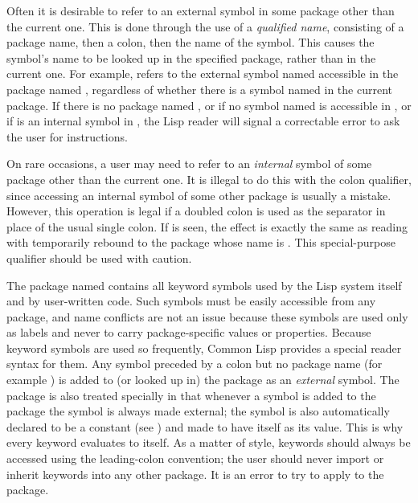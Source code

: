 Often it is desirable to refer to an external symbol in some package
other than the current one.  This is done through the use of a
\emph{qualified name}, consisting of a package name, then a colon, then the
name of the symbol.  This causes the symbol's name to be looked up
in the specified package, rather than in the current one.  For example,
 refers to the external symbol named 
accessible in the package named , regardless of whether
there is a symbol named  in the current package.  If there
is no package named , or if no symbol named 
is accessible in , or if  is an internal
symbol in , the Lisp reader will signal
a correctable error to ask the user for instructions.

On rare occasions, a user may need to refer to an \emph{internal} symbol of
some package other than the current one.  It is illegal to do this with
the colon qualifier, since accessing an internal symbol of some other
package is usually a mistake.  However, this operation is legal if
a doubled colon
\cd{::} is used as the separator in place of the usual single colon.  If
 is seen, the effect is exactly the same as
reading  with  temporarily rebound to the
package whose name is .  This special-purpose qualifier
should be used with caution.

The package named  contains all keyword symbols used by the
Lisp system itself and by user-written code.  Such symbols must be
easily accessible from any package, and name conflicts are not an issue
because these symbols are used only as labels and never to carry
package-specific values or properties.  Because keyword symbols are used
so frequently, Common Lisp provides a special reader syntax for them.
Any symbol preceded by a colon but no package name (for example
) is added to (or looked up in) the  package as
an \emph{external} symbol.  The  package is also treated
specially in that whenever a symbol is added to the  package
the symbol is always made external; the symbol
is also automatically declared to be a constant
(see ) and made to
have itself as its value.  This is why every keyword evaluates to
itself.  As a matter of style, keywords should always be accessed using
the leading-colon convention; the user should never import or inherit
keywords into any other package.  It is an error to try to apply
 to the  package.

